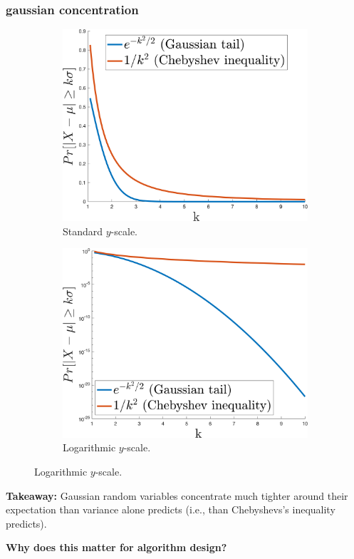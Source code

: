 \documentclass[compress]{beamer}
\begin{document}
\begin{frame}
	\frametitle{gaussian concentration}
	\begin{figure}
		\begin{subfigure}[t]{0.47\textwidth}
			\centering
			\includegraphics[width=\textwidth]{standardScale.png}
			\caption{Standard $y$-scale.}
		\end{subfigure}
		\hspace{.5em}
		\begin{subfigure}[t]{0.47\textwidth}
			\centering
			\includegraphics[width=\textwidth]{logScale.png}
			\caption{Logarithmic $y$-scale.}
		\end{subfigure}
	\end{figure}
	\textbf{Takeaway:} Gaussian random variables concentrate much tighter around their expectation than variance alone predicts (i.e., than Chebyshevs's inequality  predicts).

\begin{center}
	\alert{\textbf{Why does this matter for algorithm design?}}
\end{center}
\end{frame}
\end{document}
